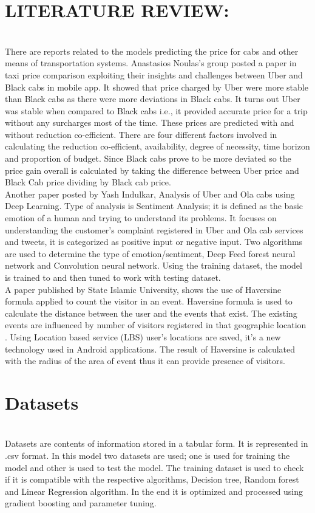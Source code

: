 \documentclass[journal,twoside,web]{ieeecolor}
\begin{document}
\section{LITERATURE REVIEW:}
\label{LITERATURE REVIEW}
\\
There are reports related to the  models  predicting  the  price for cabs and other means of transportation systems. Anastasios Noulas’s group posted a paper in taxi price comparison exploiting their insights and challenges between Uber and Black cabs in mobile app. It showed that price charged by Uber were more stable than Black cabs as there were more deviations in Black cabs. It turns out Uber was stable when compared to Black cabs i.e., it provided accurate price for a trip without any surcharges most of the time. These prices are predicted with and without reduction co-efficient. There are four different factors involved in calculating the reduction co-efficient, availability, degree of necessity, time horizon and proportion of  budget.  Since  Black  cabs  prove to be more deviated so the price gain overall is calculated by taking the difference between Uber price and Black Cab price dividing by Black cab price.
\\
Another paper posted by Yash Indulkar, Analysis of Uber and Ola cabs using Deep Learning. Type of analysis is Sentiment Analysis; it is defined as the basic emotion of a human and trying to understand its problems. It focuses on understanding the customer’s complaint registered in Uber and Ola cab services and tweets, it is categorized as positive input or negative input. Two algorithms are used to determine the type of emotion/sentiment, Deep Feed forest neural network and Convolution neural network. Using the training dataset, the model is trained to and then tuned to work with testing dataset.
\\
A paper published by State Islamic University, shows the use of Haversine formula applied to count the visitor in an event. Haversine formula is used to calculate the distance between the user and the events that exist. The  existing  events are influenced by number of visitors registered in that geographic location . Using Location based service (LBS) user’s locations are saved, it’s a new technology used in Android applications. The result of Haversine is calculated with the radius of the area of event thus it can provide presence of visitors.
\\
\section{Datasets}
\label{Datasets}
\\
Datasets are contents of information stored in a tabular form. It is represented in .csv format. In this model two datasets are used; one is used for training  the  model  and other is used to test the model. The training dataset is used     to check if it is compatible with the respective algorithms, Decision tree, Random forest and Linear Regression algorithm. In the end it is optimized and processed using gradient boosting and parameter tuning.
\\
\end{document}
